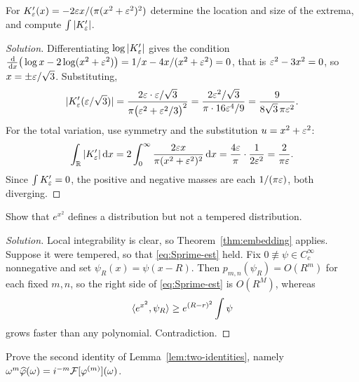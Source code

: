 \begin{exercise}\label{ex12}
For $K_{\varepsilon}'(x)=-2\varepsilon x/(\pi(x^{2}+\varepsilon^{2})^{2})$ determine the location and size of the extrema,
and compute $\int|K_{\varepsilon}'|$.
\end{exercise}

\begin{proof}[Solution]
Differentiating $\log|K_{\varepsilon}'|$ gives the condition
$\frac{\,\mathrm{d}}{\,\mathrm{d} x}\big(\log x-2\log(x^{2}+\varepsilon^{2})\big)=1/x-4x/(x^{2}+\varepsilon^{2})=0$, that is
$\varepsilon^{2}-3x^{2}=0$, so $x=\pm\varepsilon/\sqrt3$. Substituting,
\begin{equation}
|K_{\varepsilon}'(\varepsilon/\sqrt3)|
=\frac{2\varepsilon\cdot\varepsilon/\sqrt3}{\pi\big(\varepsilon^{2}+\varepsilon^{2}/3\big)^{2}}
=\frac{2\varepsilon^{2}/\sqrt3}{\pi\cdot 16\varepsilon^{4}/9}
=\frac{9}{8\sqrt3\,\pi\varepsilon^{2}} .
\end{equation}
For the total variation, use symmetry and the substitution $u=x^{2}+\varepsilon^{2}$:
\begin{equation}
\int_{\mathbb{R}}|K_{\varepsilon}'|\,\mathrm{d} x
=2\int_{0}^{\infty}\frac{2\varepsilon x}{\pi(x^{2}+\varepsilon^{2})^{2}}\,\mathrm{d} x
=\frac{4\varepsilon}{\pi}\cdot\frac{1}{2\varepsilon^{2}}
=\frac{2}{\pi\varepsilon}.
\end{equation}
Since $\int K_{\varepsilon}'=0$, the positive and negative masses are each $1/(\pi\varepsilon)$, both diverging.
\end{proof}

\begin{exercise}\label{ex13}
Show that $e^{x^{2}}$ defines a distribution but not a tempered distribution.
\end{exercise}

\begin{proof}[Solution]
Local integrability is clear, so Theorem~\ref{thm:embedding} applies. Suppose it were tempered, so
that \eqref{eq:Sprime-est} held. Fix $0\not\equiv\psi\in C_{c}^{\infty}$ nonnegative and set
$\psi_{R}(x)=\psi(x-R)$. Then $p_{m,n}(\psi_{R})=O(R^{m})$ for each fixed $m,n$, so the right side of
\eqref{eq:Sprime-est} is $O(R^{M})$, whereas
\begin{equation}
\langle e^{x^{2}},\psi_{R}\rangle\ge e^{(R-r)^{2}}\int\psi
\end{equation}
grows faster than any polynomial. Contradiction.
\end{proof}

\begin{exercise}\label{ex14}
Prove the second identity of Lemma~\ref{lem:two-identities}, namely
$\omega^{m}\widehat{\varphi}(\omega)=i^{-m}\mathcal{F}[\varphi^{(m)}](\omega)$.
\end{exercise}


